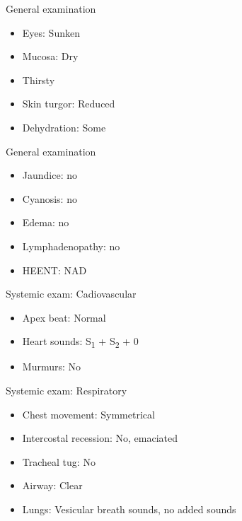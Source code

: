 \documentclass[10pt]{beamer}
\begin{document}
{
	\begin{frame}{General examination}
		\begin{itemize}
			\item Eyes: Sunken 
			\item Mucosa: Dry 
			\item Thirsty
			\item Skin turgor: Reduced
			\item Dehydration: Some 
		\end{itemize}
	\end{frame}
}

{
	\begin{frame}{General examination}
		\begin{itemize}
			\item Jaundice: no
			\item Cyanosis: no
			\item Edema: no
			\item Lymphadenopathy: no
			\item HEENT: NAD
		\end{itemize}
	\end{frame}
}

{
\begin{frame}{Systemic exam: Cadiovascular}
	\begin{itemize}
		\item Apex beat: Normal
		\item Heart sounds: S\textsubscript{1} + S\textsubscript{2} + 0
		\item Murmurs: No
	\end{itemize}
\end{frame}
}

{
\begin{frame}{Systemic exam: Respiratory}
	\begin{itemize}
		\item Chest movement: Symmetrical 
		\item Intercostal recession: No, emaciated
		\item Tracheal tug: No
		\item Airway: Clear
		\item Lungs: Vesicular breath sounds, no added sounds
	\end{itemize}
\end{frame}
}
\end{document}
